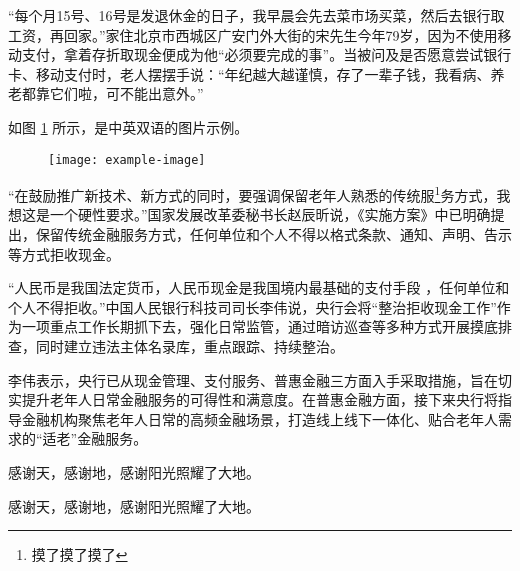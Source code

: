 \documentclass{ecnuthesis}
\begin{document}
“每个月15号、16号是发退休金的日子，我早晨会先去菜市场买菜，然后去银行取工资，再回家。”家住北京市西城区广安门外大街的宋先生今年79岁，因为不使用移动支付，拿着存折取现金便成为他“必须要完成的事”。当被问及是否愿意尝试银行卡、移动支付时，老人摆摆手说：“年纪越大越谨慎，存了一辈子钱，我看病、养老都靠它们啦，可不能出意外。”

如图 \ref{example} 所示，是中英双语的图片示例。

\begin{figure}
    \centering
    \texttt{[image: example-image]}
    \label{example}
  \end{figure}
“在鼓励推广新技术、新方式的同时，要强调保留老年人熟悉的传统服\footnote{摸了摸了摸了}务方式，我想这是一个硬性要求。”国家发展改革委秘书长赵辰昕说，《实施方案》中已明确提出，保留传统金融服务方式，任何单位和个人不得以格式条款、通知、声明、告示等方式拒收现金。

“人民币是我国法定货币，人民币现金是我国境内最基础的支付手段 \cite{Yang_Hy200215} ，任何单位和个人不得拒收。”中国人民银行科技司司长李伟说，央行会将“整治拒收现金工作”作为一项重点工作长期抓下去，强化日常监管，通过暗访巡查等多种方式开展摸底排查，同时建立违法主体名录库，重点跟踪、持续整治。

李伟表示，央行已从现金管理、支付服务、普惠金融三方面入手采取措施，旨在切实提升老年人日常金融服务的可得性和满意度。在普惠金融方面，接下来央行将指导金融机构聚焦老年人日常的高频金融场景，打造线上线下一体化、贴合老年人需求的“适老”金融服务。

\backmatter
\PrintReference

\begin{appendix}
  感谢天，感谢地，感谢阳光照耀了大地。
\end{appendix}

\begin{acknowledgement}
  感谢天，感谢地，感谢阳光照耀了大地。
\end{acknowledgement}
\end{document}
